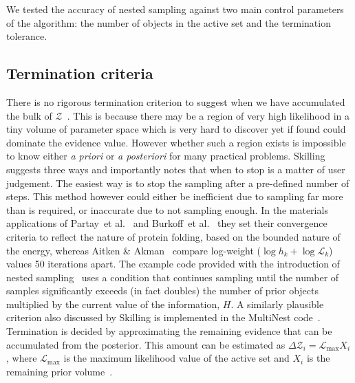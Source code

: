 We tested the accuracy of nested sampling against two main control parameters of the algorithm: the number of objects in the active set and the termination tolerance.

\subsection{Termination criteria}\label{sec:termination}
There is no rigorous termination criterion to suggest when we have accumulated the bulk of $\mathcal Z$~\cite{sivia2006}.
This is because there may be a region of very high likelihood in a tiny volume of parameter space which is very hard to discover yet if found could dominate the evidence value.
However whether such a region exists is impossible to know either \emph{a priori} or \emph{a posteriori} for many practical problems. 
Skilling~\cite{Skilling2006} suggests three ways and importantly notes that when to stop is a matter of user judgement. 
The easiest way is to stop the sampling after a pre-defined number of steps.
This method however could either be inefficient due to sampling far more than is required, or inaccurate due to not sampling enough.
In the materials applications of Partay~et al.~\cite{partay2010} and Burkoff~et al.~\cite{burkoff2012} they set their convergence criteria to reflect the nature of protein folding, based on the bounded nature of the energy, whereas Aitken \& Akman~\cite{aitken2013} compare log-weight ($\log h_k + \log\mathcal L_k$) values 50 iterations apart.
The example code provided with the introduction of nested sampling~\cite{Skilling2006} uses a condition that continues sampling until the number of samples significantly exceeds (in fact doubles) the number of prior objects multiplied by the current value of the information, $H$.
A similarly plausible criterion also discussed by Skilling is implemented in the MultiNest code~\cite{feroz2009multinest}.
Termination is decided by approximating the remaining evidence that can be accumulated from the posterior.
This amount can be estimated as $\Delta\mathcal Z_i = \mathcal L_{\max}X_i$, where $\mathcal L_{\max}$ is the maximum likelihood value of the active set and $X_i$ is the remaining prior volume~\cite{feroz2009multinest,feroz2013}.

